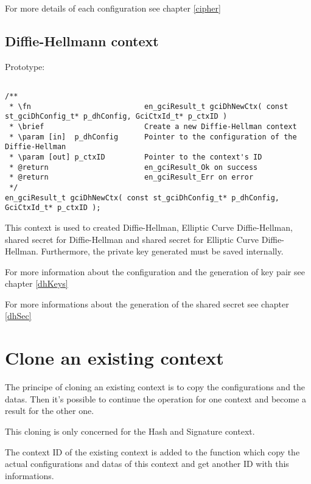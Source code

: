 For more details of each configuration see chapter \ref{cipher}


\subsection{Diffie-Hellmann context}

Prototype:
\begin{lstlisting}

/**
 * \fn							en_gciResult_t gciDhNewCtx( const st_gciDhConfig_t* p_dhConfig, GciCtxId_t* p_ctxID )
 * \brief						Create a new Diffie-Hellman context
 * \param [in]  p_dhConfig		Pointer to the configuration of the Diffie-Hellman
 * \param [out] p_ctxID			Pointer to the context's ID
 * @return						en_gciResult_Ok on success
 * @return						en_gciResult_Err on error
 */
en_gciResult_t gciDhNewCtx( const st_gciDhConfig_t* p_dhConfig, GciCtxId_t* p_ctxID );

\end{lstlisting}

This context is used to created Diffie-Hellman, Elliptic Curve Diffie-Hellman,
shared secret for Diffie-Hellman and shared secret for Elliptic Curve
Diffie-Hellman.
Furthermore, the private key generated must be saved internally. 

For more information about the configuration and the generation of key pair see
chapter \ref{dhKeys}

For more informations about the generation of the shared secret see
chapter \ref{dhSec}


\section{Clone an existing context}

The principe of cloning an existing context is to copy the configurations and
the datas. Then it's possible to continue the operation for one context and
become a result for the other one.

This cloning is only concerned for the Hash and Signature context.

The context ID of the existing context is added to the function which copy the
actual configurations and datas of this context and get another ID with this
informations.
